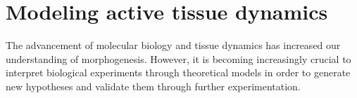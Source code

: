 %
%
%

\hypertarget{modeling-active-tissue-dynamics}{%
	\section{Modeling active tissue
		dynamics}\label{modeling-active-tissue-dynamics}}

The advancement of molecular biology and tissue dynamics has increased our understanding of morphogenesis. However, it is becoming increasingly crucial to interpret biological experiments through theoretical models in order to generate new hypotheses and validate them through further experimentation.

